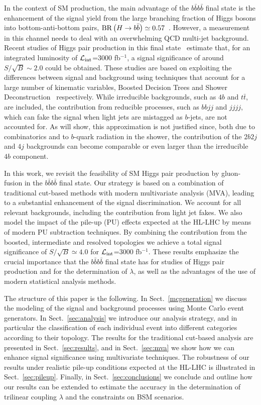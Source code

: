 In the context of SM production,
the main advantage of the $b\bar{b}b\bar{b}$ final state is the
enhancement of the signal yield
from the large branching fraction of Higgs bosons into bottom-anti-bottom
pairs, ${\rm BR}\left( H\to b\bar{b}\right)\simeq 0.57$~\cite{Dittmaier:2012vm}.
%
However, a measurement in this channel
needs to deal with an overwhelming QCD multi-jet background.
%
Recent studies of Higgs pair production in this
final state~\cite{Wardrope:2014kya,deLima:2014dta}
estimate that, for an integrated
luminosity of
$\mathcal{L}_{\rm int}$=3000 fb$^{-1}$,
a signal significance of around $S/\sqrt{B}\sim 2.0$ could be obtained.
%
These studies are
based on exploiting the differences between signal and background
using techniques that account for a large number of kinematic
variables, Boosted Decision Trees
and Shower Deconstruction~\cite{Soper:2011cr} respectively.
%
While irreducible backgrounds, such as $4b$ and
$t\bar{t}$, are included, the contribution
from reducible processes, such as $bbjj$ and
$jjjj$, which can fake the signal when 
light jets are mistagged as $b$-jets, are not accounted for.
%
As will show, this approximation is not justified since, both due to
combinatorics and to $b$-quark radiation in the shower, the
contribution of the $2b2j$ and $4j$ backgrounds can become comparable or even larger
than the irreducible $4b$ component.

In this work, we revisit the feasibility of SM Higgs pair production by gluon-fusion
in the $b\bar{b}b\bar{b}$ final state.
%
 Our strategy is based on a combination of traditional cut-based
 methods with modern multivariate analysis (MVA),
 leading to a substantial
  enhancement of the signal discrimination.
  We account for  all relevant
  backgrounds, including the contribution from light jet fakes.
  We also model the impact of the pile-up (PU) effects expected at the
  HL-LHC by means of modern PU subtraction techniques.
  By combining the contribution from the boosted, intermediate and resolved
  topologies we achieve a total signal significance of $S/\sqrt{B}\simeq 4.0$
  for $\mathcal{L}_{\rm int}$=3000 fb$^{-1}$.
%
  These results emphasize the crucial importance that the $b\bar{b}b\bar{b}$ final state
  has for studies of Higgs pair production and for the determination of
  $\lambda$, as well as the advantages of the use of modern statistical
  analysis methods.
  
  
The structure of this paper is the following.
%
In Sect.~\ref{mcgeneration} we discuss the modeling of the signal
and background processes using Monte Carlo event generators.
%
In Sect.~\ref{sec:analysis}
we introduce our analysis strategy, and in particular
the classification of each individual event into
different categories according to their topology.
%
The results for the traditional cut-based analysis
are presented in Sect.~\ref{sec:results}, and in
Sect.~\ref{sec:mva} we show how we can enhance signal
significance using multivariate techniques.
%
The robustness of our results under realistic pile-up
conditions expected at the HL-LHC is illustrated in
 Sect.~\ref{sec:pileup}.
%
Finally, in Sect.~\ref{sec:conclusions} we conclude and outline
how our results can be extended to estimate the accuracy
in the determination of trilinear coupling $\lambda$ and the constraints on
BSM scenarios.
